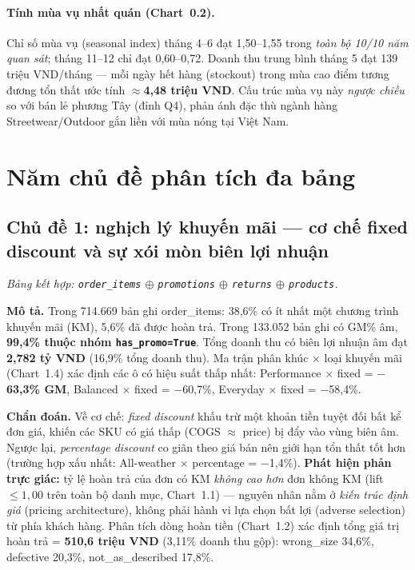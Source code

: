 \documentclass{article}
\begin{document}
\paragraph{Tính mùa vụ nhất quán (Chart~0.2).}
Chỉ số mùa vụ (seasonal index) tháng 4--6 đạt 1,50--1,55 trong \textit{toàn bộ 10/10 năm quan sát}; tháng 11--12 chỉ đạt 0,60--0,72. Doanh thu trung bình tháng 5 đạt 139 triệu VND/tháng --- mỗi ngày hết hàng (stockout) trong mùa cao điểm tương đương tổn thất ước tính \textbf{$\approx$4,48 triệu VND}. Cấu trúc mùa vụ này \textit{ngược chiều} so với bán lẻ phương Tây (đỉnh Q4), phản ánh đặc thù ngành hàng Streetwear/Outdoor gắn liền với mùa nóng tại Việt Nam.

\section{Năm chủ đề phân tích đa bảng}
\label{sec:themes}

\subsection{Chủ đề 1: nghịch lý khuyến mãi --- cơ chế fixed discount và sự xói mòn biên lợi nhuận}
\label{sec:theme1}
\textit{Bảng kết hợp: \texttt{order\_items} $\oplus$ \texttt{promotions} $\oplus$ \texttt{returns} $\oplus$ \texttt{products}.}

\textbf{Mô tả.} Trong 714.669 bản ghi order\_items: 38,6\% có ít nhất một chương trình khuyến mãi (KM), 5,6\% đã được hoàn trả. Trong 133.052 bản ghi có GM\% âm, \textbf{99,4\% thuộc nhóm \texttt{has\_promo=True}}. Tổng doanh thu có biên lợi nhuận âm đạt \textbf{2,782 tỷ VND} (16,9\% tổng doanh thu). Ma trận phân khúc $\times$ loại khuyến mãi (Chart~1.4) xác định các ô có hiệu suất thấp nhất: Performance $\times$ fixed = \textbf{$-$63,3\% GM}, Balanced $\times$ fixed = $-$60,7\%, Everyday $\times$ fixed = $-$58,4\%.

\textbf{Chẩn đoán.} Về cơ chế: \textit{fixed discount} khấu trừ một khoản tiền tuyệt đối bất kể đơn giá, khiến các SKU có giá thấp (COGS $\approx$ price) bị đẩy vào vùng biên âm. Ngược lại, \textit{percentage discount} co giãn theo giá bán nên giới hạn tổn thất tốt hơn (trường hợp xấu nhất: All-weather $\times$ percentage = $-$1,4\%). \textbf{Phát hiện phản trực giác:} tỷ lệ hoàn trả của đơn có KM \textit{không cao hơn} đơn không KM (lift $\leq 1,00$ trên toàn bộ danh mục, Chart~1.1) --- nguyên nhân nằm ở \textit{kiến trúc định giá} (pricing architecture), không phải hành vi lựa chọn bất lợi (adverse selection) từ phía khách hàng. Phân tích dòng hoàn tiền (Chart~1.2) xác định tổng giá trị hoàn trả = \textbf{510,6 triệu VND} (3,11\% doanh thu gộp): wrong\_size 34,6\%, defective 20,3\%, not\_as\_described 17,8\%.
\end{document}
